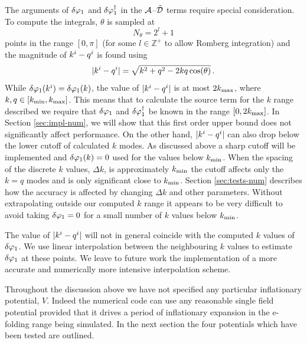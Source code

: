 The arguments of $\delta\varphi_{1}$ and $\delta\varphi_{1}^{\dagger}$ in the $\mathcal{A}$--$\tilde{\mathcal{D}}$ terms require
special consideration. 
To compute the integrals, $\theta$ is sampled at 
% 
\begin{equation}
\label{eq:nthetadefn}
N_\theta = 2^l + 1
\end{equation}
% 
points in the range
$[0,\pi]$ (for some $l\in \mathbb{Z}^+$ to allow Romberg integration) and the
magnitude of
$k^i-q^i$
is
found using
% 
\begin{equation}
 |k^i -q^i| = \sqrt{k^2 + q^2 - 2kq\cos(\theta)}\,.
\end{equation}
%
While $\delta\varphi_{1}(k^i)=\delta\varphi_{1}(k)$, the value of $|k^i-q^i|$ is at most
$2k_{\mathrm{max}}$, where $k,q \in [k_{\mathrm{min}},k_{\mathrm{max}}]$. This means that to calculate
the source term for the $k$ range described we require that $\delta\varphi_{1}$
and $\delta\varphi_{1}^{\dagger}$ be known in the range $[0, 2k_{\mathrm{max}}]$. In
Section \ref{sec:impl-num}, we will 
show that this first order upper bound does not significantly affect
performance. On the other hand, $|k^i-q^i|$ can also drop below the
lower cutoff of calculated $k$ modes. As discussed above a sharp cutoff will be
implemented and $\delta\varphi_{1}(k)=0$ used for the values below
$k_{\mathrm{min}}$. When the spacing of the discrete $k$ values, $\Delta k$,  is
approximately $k_{\mathrm{min}}$ the cutoff affects only the $k=q$ modes and
is only significant close to $k_{\mathrm{min}}$. 
Section \ref{sec:tests-num}
describes how the accuracy is affected by changing $\Delta k$ and
other parameters. Without extrapolating outside our computed $k$ range
it appears to be very difficult to avoid taking $\delta\varphi_{1}=0$ for a small number of
$k$ values below $k_{\mathrm{min}}$.


The value of $|k^i-q^i|$ will not in general coincide with the computed $k$
values of $\delta\varphi_{1}$. We use linear interpolation between the neighbouring $k$ values to
estimate $\delta\varphi_{1}$ at these points. We leave to future work the
implementation of a more
accurate and numerically more intensive interpolation scheme.


Throughout the discussion above we have not specified any particular inflationary
potential, $V$. Indeed the numerical code can use any reasonable
single field potential provided that it drives a period of inflationary expansion in
the e-folding range being simulated. In the next section the four potentials which
have been tested are outlined. 

